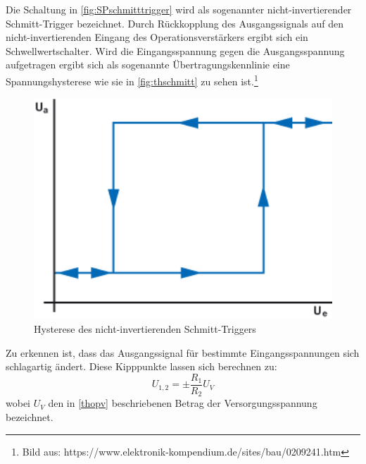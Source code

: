 Die Schaltung in \autoref{fig:SPschmitttrigger} wird als sogenannter nicht-invertierender Schmitt-Trigger bezeichnet. 
Durch Rückkopplung des Ausgangssignals auf den nicht-invertierenden Eingang des Operationsverstärkers ergibt sich ein Schwellwertschalter.
Wird die Eingangsspannung gegen die Ausgangsspannung aufgetragen ergibt sich als sogenannte Übertragungskennlinie eine Spannungshysterese wie sie in \autoref{fig:thschmitt} zu sehen ist.\footnote{Bild aus: https://www.elektronik-kompendium.de/sites/bau/0209241.htm} 
\begin{figure}
    \centering
    \includegraphics[width=1\textwidth]{content/grafiken/Schmitthysterese.png}
    \caption{Hysterese des nicht-invertierenden Schmitt-Triggers}
    \label{fig:thschmitt}
\end{figure}
Zu erkennen ist, dass das Ausgangssignal für bestimmte Eingangsspannungen sich schlagartig ändert. Diese Kipppunkte lassen sich berechnen zu:
\begin{equation} 
U_{1,2} = \pm \frac{R_1}{R_2} U_V
\end{equation}\label{eq:kipppunkt}
wobei $U_V$ den in \autoref{thopv} beschriebenen Betrag der Versorgungsspannung bezeichnet.





